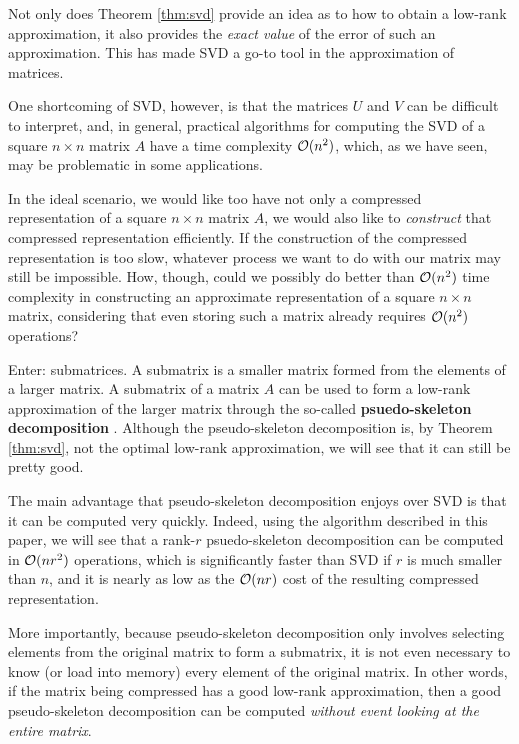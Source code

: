 \documentclass{article}
\begin{document}
	Not only does Theorem \ref{thm:svd} provide an idea as to how to obtain a low-rank approximation, it also provides the \textit{exact value} of the error of such an approximation. This has made SVD a go-to tool in the approximation of matrices.
	
	One shortcoming of SVD, however, is that the matrices $U$ and $V$ can be difficult to interpret, and, in general, practical algorithms for computing the SVD of a square $n\times n$ matrix $A$ have a time complexity $\mathcal{O}(n^2)$, which, as we have seen, may be problematic in some applications.
	
	
	In the ideal scenario, we would like too have not only a compressed representation of a square $n\times n$ matrix $A$, we would also like to \textit{construct} that compressed representation efficiently. If the construction of the compressed representation is too slow, whatever process we want to do with our matrix may still be impossible. How, though, could we possibly do better than $\mathcal{O}(n^2)$ time complexity in constructing an approximate representation of a square $n\times n$ matrix, considering that even storing such a matrix already requires $\mathcal{O}(n^2)$ operations?
	
	Enter: submatrices. A submatrix is a smaller matrix formed from the elements of a larger matrix. A submatrix of a matrix $A$ can be used to form a low-rank approximation of the larger matrix through the so-called \textbf{psuedo-skeleton decomposition} \cite{goreinov_1997}. Although the pseudo-skeleton decomposition is, by Theorem \ref{thm:svd}, not the optimal low-rank approximation, we will see that it can still be pretty good.
	
	The main advantage that pseudo-skeleton decomposition enjoys over SVD is that it can be computed very quickly. Indeed, using the algorithm described in this paper, we will see that a rank-$r$ psuedo-skeleton decomposition can be computed in $\mathcal{O}(nr^2)$ operations, which is significantly faster than SVD if $r$ is much smaller than $n$, and it is nearly as low as the $\mathcal{O}(nr)$ cost of the resulting compressed representation.
	
	More importantly, because pseudo-skeleton decomposition only involves selecting elements from the original matrix to form a submatrix, it is not even necessary to know (or load into memory) every element of the original matrix. In other words, if the matrix being compressed has a good low-rank approximation, then a good pseudo-skeleton decomposition can be computed \textit{without event looking at the entire matrix}.
	
\end{document}
